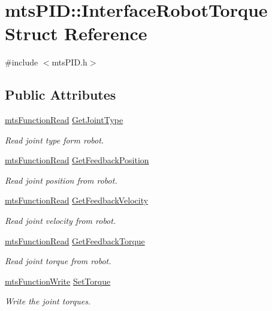 \hypertarget{structmts_p_i_d_1_1_interface_robot_torque}{}\section{mts\+P\+I\+D\+:\+:Interface\+Robot\+Torque Struct Reference}
\label{structmts_p_i_d_1_1_interface_robot_torque}


{\ttfamily \#include $<$mts\+P\+I\+D.\+h$>$}

\subsection*{Public Attributes}
\begin{DoxyCompactItemize}
\item 
\hyperlink{classmts_function_read}{mts\+Function\+Read} \hyperlink{structmts_p_i_d_1_1_interface_robot_torque_aa8d665775f11c3a1b25340727efe2d0c}{Get\+Joint\+Type}
\begin{DoxyCompactList}\small\item\em Read joint type form robot. \end{DoxyCompactList}\item 
\hyperlink{classmts_function_read}{mts\+Function\+Read} \hyperlink{structmts_p_i_d_1_1_interface_robot_torque_ad9c2f6fcbbe6c2252490cc8771193b2f}{Get\+Feedback\+Position}
\begin{DoxyCompactList}\small\item\em Read joint position from robot. \end{DoxyCompactList}\item 
\hyperlink{classmts_function_read}{mts\+Function\+Read} \hyperlink{structmts_p_i_d_1_1_interface_robot_torque_a366f8fdbec2f81579b25fab5ab27a61a}{Get\+Feedback\+Velocity}
\begin{DoxyCompactList}\small\item\em Read joint velocity from robot. \end{DoxyCompactList}\item 
\hyperlink{classmts_function_read}{mts\+Function\+Read} \hyperlink{structmts_p_i_d_1_1_interface_robot_torque_af2c054da656a47a76d69831ca0908bb4}{Get\+Feedback\+Torque}
\begin{DoxyCompactList}\small\item\em Read joint torque from robot. \end{DoxyCompactList}\item 
\hyperlink{classmts_function_write}{mts\+Function\+Write} \hyperlink{structmts_p_i_d_1_1_interface_robot_torque_a05317acc6fa8b2e125d2a6c3f5d55f86}{Set\+Torque}
\begin{DoxyCompactList}\small\item\em Write the joint torques. \end{DoxyCompactList}\end{DoxyCompactItemize}


